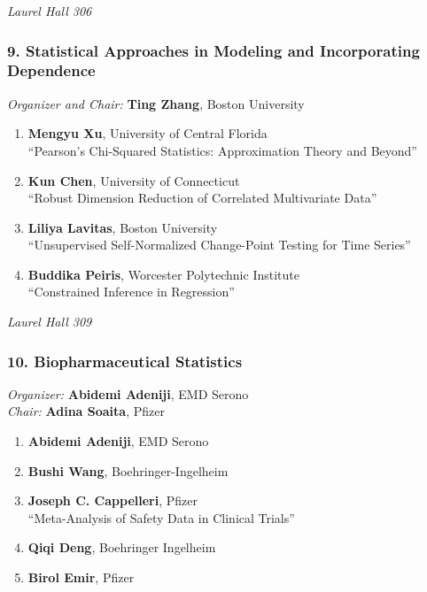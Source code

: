 \emph{Laurel Hall 306} \\[.5em]

\subsubsection*{9. Statistical Approaches in Modeling and Incorporating Dependence}

\emph{Organizer and Chair:} \textbf{Ting Zhang}, Boston University

\begin{enumerate}
\item \textbf{Mengyu Xu}, University of Central Florida \\
``Pearson’s Chi-Squared Statistics: Approximation Theory and Beyond''
\item \textbf{Kun Chen}, University of Connecticut \\
``Robust Dimension Reduction of Correlated Multivariate Data''
\item \textbf{Liliya Lavitas}, Boston University \\
``Unsupervised Self-Normalized Change-Point Testing for Time Series''
\item \textbf{Buddika Peiris}, Worcester Polytechnic Institute \\
``Constrained Inference in Regression''
\end{enumerate}

\emph{Laurel Hall 309} \\[.5em]

\subsubsection*{10. Biopharmaceutical Statistics}

\emph{Organizer:} \textbf{Abidemi Adeniji}, EMD Serono \\
\emph{Chair:} \textbf{Adina Soaita}, Pfizer

\begin{enumerate}
\item \textbf{Abidemi Adeniji}, EMD Serono 
\item \textbf{Bushi Wang}, Boehringer-Ingelheim 
\item \textbf{Joseph C. Cappelleri}, Pfizer \\
``Meta-Analysis of Safety Data in Clinical Trials''
\item \textbf{Qiqi Deng}, Boehringer Ingelheim 
\item \textbf{Birol Emir}, Pfizer 
\end{enumerate}

